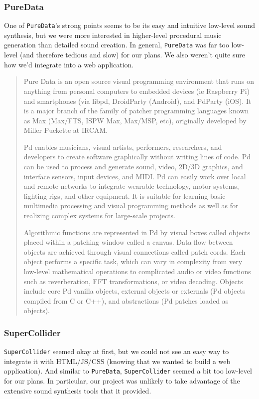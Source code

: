 \documentclass[12pt,a4paper]{article}
\newcommand{\lightcode}[1]{\colorbox{light-gray}{\texttt{#1}}}
\begin{document}
\subsubsection{PureData}
One of \lightcode{PureData}'s strong points seems to be its easy and intuitive low-level sound synthesis, but we were more interested in higher-level procedural music generation than detailed sound creation. In general, \lightcode{PureData} was far too low-level (and therefore tedious and slow) for our plans. We also weren't quite sure how we'd integrate into a web application.

\begin{quote}
Pure Data is an open source visual programming environment that runs on anything from personal computers to embedded devices (ie Raspberry Pi) and smartphones (via libpd, DroidParty (Android), and PdParty (iOS). It is a major branch of the family of patcher programming languages known as Max (Max/FTS, ISPW Max, Max/MSP, etc), originally developed by Miller Puckette at IRCAM.

Pd enables musicians, visual artists, performers, researchers, and developers to create software graphically without writing lines of code. Pd can be used to process and generate sound, video, 2D/3D graphics, and interface sensors, input devices, and MIDI. Pd can easily work over local and remote networks to integrate wearable technology, motor systems, lighting rigs, and other equipment. It is suitable for learning basic multimedia processing and visual programming methods as well as for realizing complex systems for large-scale projects.

Algorithmic functions are represented in Pd by visual boxes called objects placed within a patching window called a canvas. Data flow between objects are achieved through visual connections called patch cords. Each object performs a specific task, which can vary in complexity from very low-level mathematical operations to complicated audio or video functions such as reverberation, FFT transformations, or video decoding. Objects include core Pd vanilla objects, external objects or externals (Pd objects compiled from C or C++), and abstractions (Pd patches loaded as objects). \cite{puredata}
\end{quote}

\subsubsection{SuperCollider}
\lightcode{SuperCollider} seemed okay at first, but we could not see an easy way to integrate it with HTML/JS/CSS (knowing that we wanted to build a web application). And similar to \lightcode{PureData}, \lightcode{SuperCollider} seemed a bit too low-level for our plans. In particular, our project was unlikely to take advantage of the extensive sound synthesis tools that it provided.
\end{document}

